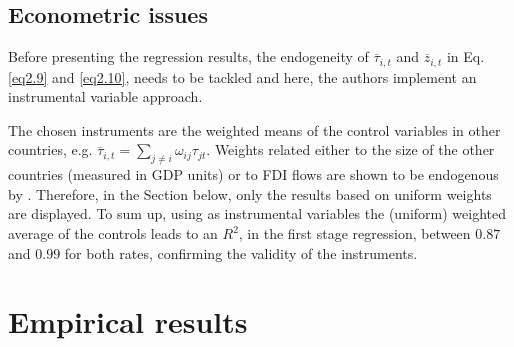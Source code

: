 \vspace{-5pt}
\subsection{Econometric issues}

Before presenting the regression results, the endogeneity of $\overline{\tau}_{i,t}$ and $\overline{z}_{i,t}$ in Eq. \ref{eq2.9} and \ref{eq2.10}, needs to be tackled and here, the authors implement an instrumental variable approach.

The chosen instruments are the weighted means of the control variables in other countries, e.g. $\overline{\tau}_{i,t}=\sum_{j\neq i}\omega_{ij}\tau_{jt}$. Weights related either to the size of the other countries (measured in GDP units) or to FDI flows are shown to be endogenous by \textcite{dev-loc-red-08}. Therefore, in the Section below, only the results based on uniform weights are displayed. To sum up, using as instrumental variables the (uniform) weighted average of the controls leads to an $R^2$, in the first stage regression, between $0.87$ and $0.99$ for both rates, confirming the validity of the instruments.
\vspace{-10pt}
\section{Empirical results}
\vspace{-10pt}
